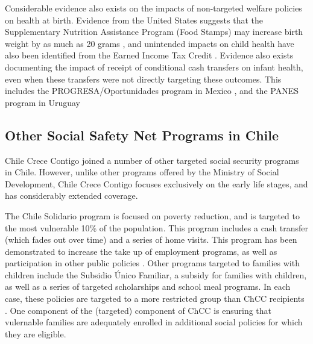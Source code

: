 \documentclass[12pt]{article}
\begin{document}
\begin{spacing}{1.4}
Considerable evidence also exists on the impacts of non-targeted
welfare policies on health at birth.  Evidence from the United
States suggests that the Supplementary Nutrition Assistance Program
(Food Stamps) may increase birth weight by as much as 20 grams
\citep{Almondetal2011}, and unintended impacts on child health
have also been identified from the Earned Income Tax Credit
\citep{Hoynesetal2015}.  Evidence also exists documenting the
impact of receipt of conditional cash transfers on infant health,
even when these transfers were not directly targeting these
outcomes.  This includes the PROGRESA/Oportunidades program
in Mexico \citep{Barham2011}, and the PANES program in Uruguay
\citep{Amaranteetal2016}



\subsection{Other Social Safety Net Programs in Chile}
Chile Crece Contigo joined a number of other targeted social
security programs in Chile.  However, unlike other programs
offered by the Ministry of Social Development, Chile Crece
Contigo focuses exclusively on the early life stages, and has
considerably extended coverage.

The Chile Solidario program is focused on poverty reduction, and
is targeted to the most vulnerable 10\% of the population.  This
program includes a cash transfer (which fades out over time) and
a series of home visits.  This program has been demonstrated to
increase the take up of employment programs, as well as participation
in other public policies \citep{Carneiroetal2014}.  Other
programs targeted to families with children include the Subsidio
\'Unico Familiar, a subsidy for families with children, as well
as a series of targeted scholarships and school meal programs.
In each case, these policies are targeted to a more restricted
group than ChCC recipients \citep{Herreraetal2010}.  One
component of the (targeted) component of ChCC is ensuring that
vulernable families are adequately enrolled in additional
social policies for which they are eligible.


\end{spacing}
\end{document}
